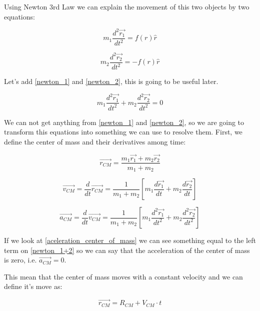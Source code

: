 Using Newton 3rd Law we can explain the movement of this two objects by two equations:

\begin{equation}
    \label{newton_1}
    m_1 \frac{d^2\vec{r_1}}{dt^2} = f(r)\hat{r}
\end{equation}

\begin{equation}
    \label{newton_2}
    m_2 \frac{d^2\vec{r_2}}{dt^2} = - f(r)\hat{r}
\end{equation}

Let's add \ref{newton_1} and \ref{newton_2}, this is going to be useful later.

\begin{equation}
    \label{newton_1+2}
    m_1\frac{d^2\vec{r_1}}{dt^2} + m_2\frac{d^2\vec{r_2}}{dt^2} = 0
\end{equation}

We can not get anything from \ref{newton_1} and \ref{newton_2}, so we are going to transform this equations into something we can use to resolve them. First, we define the center of mass and their derivatives among time:

\begin{equation}
    \label{center_of_mass}
    \vec{r_{CM}}=\frac{m_1\vec{r_1} + m_2\vec{r_2}}{m_1 + m_2}
\end{equation}

\begin{equation}
    \label{velocity_center_of_mass}
    \vec{v_{CM}}=\frac{d}{dt}\vec{r_{CM}} = \frac{1}{m_1 + m_2}\left[m_1\frac{d\vec{r_1}}{dt} + m_2\frac{d\vec{r_2}}{dt}  \right]
\end{equation}

\begin{equation}
    \label{aceleration_center_of_mass}
    \vec{a_{CM}}=\frac{d}{dt}\vec{v_{CM}} = \frac{1}{m_1 + m_2}\left[m_1\frac{d^2\vec{r_1}}{dt^2} + m_2\frac{d^2\vec{r_2}}{dt^2}  \right]
\end{equation}

If we look at \ref{aceleration_center_of_mass} we can see something equal to the left term on \ref{newton_1+2} so we can say that the acceleration of the center of mass is zero, i.e. $\vec{a_{CM}} = 0$.

This mean that the center of mass moves with a constant velocity and we can define it's move as:

\begin{equation}
    \label{center_of_mass_2}
    \vec{r_{CM}}= R_{CM} + V_{CM} \cdot t
\end{equation}

